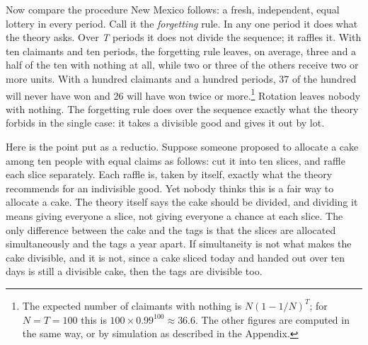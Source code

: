 \documentclass[
  11pt,
  letterpaper,
  DIV=11,
  numbers=noendperiod,
  twoside]{scrartcl}
\begin{document}
Now compare the procedure New Mexico follows: a fresh, independent,
equal lottery in every period. Call it the \emph{forgetting} rule. In
any one period it does what the theory asks. Over \emph{T} periods it
does not divide the sequence; it raffles it. With ten claimants and ten
periods, the forgetting rule leaves, on average, three and a half of the
ten with nothing at all, while two or three of the others receive two or
more units. With a hundred claimants and a hundred periods, 37 of the
hundred will never have won and 26 will have won twice or
more.\footnote{The expected number of claimants with nothing is
  \(N(1-1/N)^T\); for \(N = T = 100\) this is
  \(100 \times 0.99^{100} \approx 36.6\). The other figures are computed
  in the same way, or by simulation as described in the Appendix.}
Rotation leaves nobody with nothing. The forgetting rule does over the
sequence exactly what the theory forbids in the single case: it takes a
divisible good and gives it out by lot.

Here is the point put as a reductio. Suppose someone proposed to
allocate a cake among ten people with equal claims as follows: cut it
into ten slices, and raffle each slice separately. Each raffle is, taken
by itself, exactly what the theory recommends for an indivisible good.
Yet nobody thinks this is a fair way to allocate a cake. The theory
itself says the cake should be divided, and dividing it means giving
everyone a slice, not giving everyone a chance at each slice. The only
difference between the cake and the tags is that the slices are
allocated simultaneously and the tags a year apart. If simultaneity is
not what makes the cake divisible, and it is not, since a cake sliced
today and handed out over ten days is still a divisible cake, then the
tags are divisible too.
\end{document}
